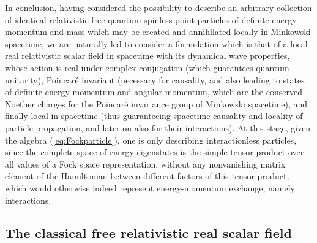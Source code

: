 \documentclass[a4paper,11pt]{article}
\begin{document}
In conclusion, having considered the possibility to describe an
arbitrary collection of identical relativistic free quantum spinless 
point-particles of de\-fi\-ni\-te energy-momentum and mass which
may be created and annihilated locally in Minkowski spacetime, we are
naturally led to consider a formulation which is that of a local real
relativistic scalar field in spacetime with its dy\-na\-mi\-cal wave 
properties, 
whose action is real under complex conjugation (which guarantees quantum 
unitarity), Poincar\'e invariant (necessary for causality, and also leading 
to states of definite energy-momentum and angular momentum, which are the 
conserved Noether charges for the Poincar\'e invariance group of Minkowski 
spacetime), and finally local in spacetime (thus gua\-ran\-tee\-ing spacetime 
causality and locality of particle propagation, and later on also for their 
interactions). At this stage, given the algebra
(\ref{eq:Fockparticle}), one is only describing interactionless
particles, since the complete space of energy eigenstates is the simple
tensor product over all \coordHE{} values of a Fock space representation,
without any nonvanishing matrix element of the Hamiltonian between
dif\-fe\-rent factors of this tensor product, which would otherwise indeed
represent energy-momentum exchange, namely interactions.

\subsection{The classical free relativistic real scalar field}
\label{Subsect3.2}
\end{document}
